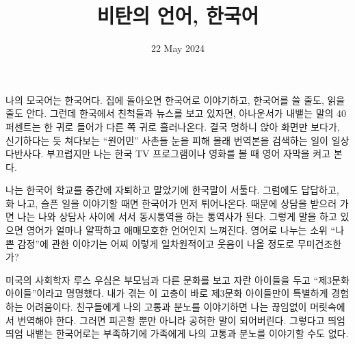 \documentclass{translation}
\date{22 May 2024}
\title{비탄의 언어, 한국어}
\begin{document}
나의 모국어는 한국어다.
집에 돌아오면 한국어로 이야기하고, 한국어를 쓸 줄도, 읽을 줄도 안다.
그런데 한국에서 친척들과 뉴스를 보고 있자면, 아나운서가 내뱉는 말의 40 퍼센트는 한 귀로 들어가 다른 쪽 귀로 흘러나온다.
결국 멍하니 앉아 화면만 보다가, 신기하다는 듯 쳐다보는 ``원어민'' 사촌들 눈을 피해 몰래 번역본을 검색하는 일이 일상다반사다.
부끄럽지만 나는 한국  TV 프로그램이나 영화를 볼 때 영어 자막을 켜고 본다.
%  

나는 한국어 학교를 중간에 자퇴하고 말았기에 한국말이 서툴다.
그럼에도 답답하고, 화 나고, 슬픈 일을 이야기할 때면 한국어가 먼저 튀어나온다.
때문에 상담을 받으러 가면 나는 나와 상담사 사이에 서서 동시통역을 하는 통역사가 된다.
그렇게 말을 하고 있으면 영어가 얼마나 얄팍하고 애매모호한 언어인지 느껴진다.
영어로 나누는 소위 ``나쁜 감정''에 관한 이야기는 어찌 이렇게 일차원적이고 웃음이 나올 정도로 무미건조한가?
%  

미국의 사회학자 루스 우심은 부모님과 다른 문화를 보고 자란 아이들을 두고 ``제3문화 아이들''이라고 명명했다.
내가 겪는 이 고충이 바로 제3문화 아이들만이 특별하게 경험하는 어려움이다.
친구들에게 나의 고통과 분노를 이야기하면 나는 끊임없이 머릿속에서 번역해야 한다.
그러면 피곤할 뿐만 아니라 공허한 말이 되어버린다.
그렇다고 띄엄띄엄 내뱉는 한국어로는 부족하기에 가족에게 나의 고통과 분노를 이야기할 수도 없다.
%  
\end{document}
